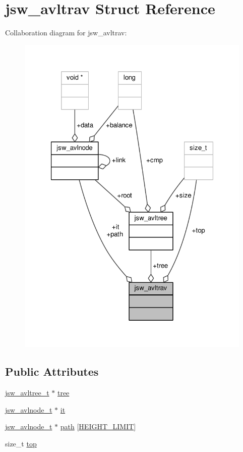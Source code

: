 \hypertarget{structjsw__avltrav}{\section{jsw\-\_\-avltrav Struct Reference}
\label{structjsw__avltrav}
}


Collaboration diagram for jsw\-\_\-avltrav\-:
\nopagebreak
\begin{figure}[H]
\begin{center}
\leavevmode
\includegraphics[width=323pt]{structjsw__avltrav__coll__graph}
\end{center}
\end{figure}
\subsection*{Public Attributes}
\begin{DoxyCompactItemize}
\item 
\hyperlink{avltree_8h_a4719c53f3b192c81b56668b5f5b3ca52}{jsw\-\_\-avltree\-\_\-t} $\ast$ \hyperlink{structjsw__avltrav_afb44d2be6eaf537a2378840512abd785}{tree}
\item 
\hyperlink{avltree_8c_a8d43f5292c3f20dae53793e7c3723f3b}{jsw\-\_\-avlnode\-\_\-t} $\ast$ \hyperlink{structjsw__avltrav_acfd4c49213f67888c8a9624e1342c56e}{it}
\item 
\hyperlink{avltree_8c_a8d43f5292c3f20dae53793e7c3723f3b}{jsw\-\_\-avlnode\-\_\-t} $\ast$ \hyperlink{structjsw__avltrav_a5a1972b74cbe3476115940fb25f50799}{path} \mbox{[}\hyperlink{avltree_8c_a8a9cf4e7e1f3ae66d78e67246f158cd1}{H\-E\-I\-G\-H\-T\-\_\-\-L\-I\-M\-I\-T}\mbox{]}
\item 
size\-\_\-t \hyperlink{structjsw__avltrav_aa2c8a23244b4e292704f53dd2962f15e}{top}
\end{DoxyCompactItemize}


